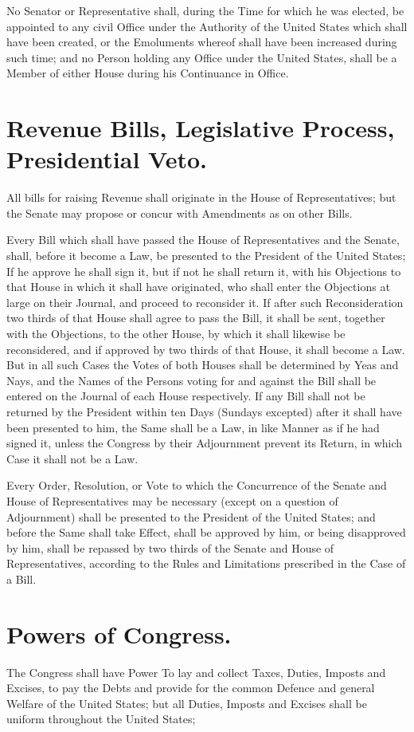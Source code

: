 \documentclass[12pt]{constitution}
\begin{document}
No Senator or Representative shall, during the Time for which he was elected,
be appointed to any civil Office under the Authority of the United States which
shall have been created, or the Emoluments whereof shall have been increased
during such time; and no Person holding any Office under the United States,
shall be a Member of either House during his Continuance in Office.


\section{Revenue Bills, Legislative Process, Presidential Veto.}
All bills for raising Revenue shall originate in the House of Representatives;
but the Senate may propose or concur with Amendments as on other Bills.

Every Bill which shall have passed the House of Representatives and the Senate,
shall, before it become a Law, be presented to the President of the United
States; If he approve he shall sign it, but if not he shall return it, with his
Objections to that House in which it shall have originated, who shall enter the
Objections at large on their Journal, and proceed to reconsider it. If after
such Reconsideration two thirds of that House shall agree to pass the Bill, it
shall be sent, together with the Objections, to the other House, by which it
shall likewise be reconsidered, and if approved by two thirds of that House, it
shall become a Law. But in all such Cases the Votes of both Houses shall be
determined by Yeas and Nays, and the Names of the Persons voting for and
against the Bill shall be entered on the Journal of each House respectively. If
any Bill shall not be returned by the President within ten Days (Sundays
excepted) after it shall have been presented to him, the Same shall be a Law,
in like Manner as if he had signed it, unless the Congress by their Adjournment
prevent its Return, in which Case it shall not be a Law.

Every Order, Resolution, or Vote to which the Concurrence of the Senate and
House of Representatives may be necessary (except on a question of Adjournment)
shall be presented to the President of the United States; and before the Same
shall take Effect, shall be approved by him, or being disapproved by him, shall
be repassed by two thirds of the Senate and House of Representatives, according
to the Rules and Limitations prescribed in the Case of a Bill.


\section{Powers of Congress.}
The Congress shall have Power To lay and collect Taxes, Duties, Imposts and
Excises, to pay the Debts and provide for the common Defence and general
Welfare of the United States; but all Duties, Imposts and Excises shall be
uniform throughout the United States;
\end{document}
